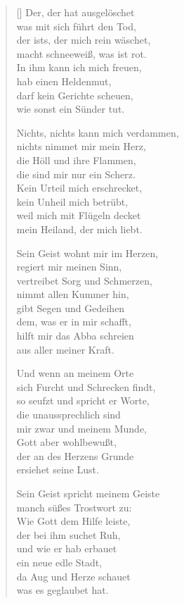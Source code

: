 \begin{multicols}{2}
\begin{verse}[\versewidth]
 Der, der hat ausgelöschet\\
was mit sich führt den Tod,\\
der ists, der mich rein wäschet,\\
macht schneeweiß, was ist rot.\\
In ihm kann ich mich freuen,\\
hab einen Heldenmut,\\
darf kein Gerichte scheuen,\\
wie sonst ein Sünder tut.

 Nichts, nichts kann mich verdammen,\\
nichts nimmet mir mein Herz,\\
die Höll und ihre Flammen,\\
die sind mir nur ein Scherz.\\
Kein Urteil mich erschrecket,\\
kein Unheil mich betrübt,\\
weil mich mit Flügeln decket\\
mein Heiland, der mich liebt.

 Sein Geist wohnt mir im Herzen,\\
regiert mir meinen Sinn,\\
vertreibet Sorg und Schmerzen,\\
nimmt allen Kummer hin,\\
gibt Segen und Gedeihen\\
dem, was er in mir schafft,\\
hilft mir das Abba schreien\\
aus aller meiner Kraft.

\vfill\null
\columnbreak

 Und wenn an meinem Orte\\
sich Furcht und Schrecken findt,\\
so seufzt und spricht er Worte,\\
die unaussprechlich sind\\
mir zwar und meinem Munde,\\
Gott aber wohlbewußt,\\
der an des Herzens Grunde\\
ersiehet seine Lust.

 Sein Geist spricht meinem Geiste\\
manch süßes Trostwort zu:\\
Wie Gott dem Hilfe leiste,\\
der bei ihm suchet Ruh,\\
und wie er hab erbauet\\
ein neue edle Stadt,\\
da Aug und Herze schauet\\
was es geglaubet hat.


\end{verse}
\end{multicols}
